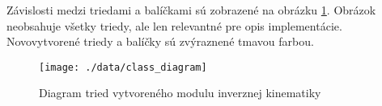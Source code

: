 Závislosti medzi triedami a balíčkami sú zobrazené na obrázku \ref{pic_class_diagram}. Obrázok neobsahuje všetky triedy, ale len relevantné pre opis implementácie. Novovytvorené triedy a balíčky sú zvýraznené tmavou farbou.

\begin{landscape}
\thispagestyle{empty}
\begin{figure}[H]
\centering
	\texttt{[image: ./data/class\_diagram]}
	\caption{Diagram tried vytvoreného modulu inverznej kinematiky}
	\label{pic_class_diagram}
\end{figure}
\end{landscape}
